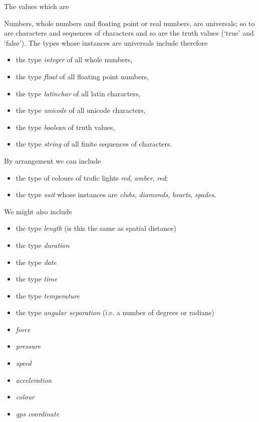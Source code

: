 The values which are 

\mynote 
Numbers, whole numbers and floating point or real numbers, are universals;
 so to are characters and sequences of characters and so are the truth values (`true' and `false'). 
The types whose instances are universals include therefore
\begin{itemize}
	\item the type \textit{integer} of all whole numbers,
	\item the type \textit{float} of all floating point numbers,
	\item the type \textit{latinchar} of all latin characters,
	\item the type \textit{unicode} of all unicode characters,
	\item the type \textit{boolean} of truth values,
	\item the type \textit{string} of all finite sequences of characters.
\end{itemize}

\mynote By arrangement we can include
\begin{itemize}
	\item the type of colours of trafic lights \textit{red}, \textit{amber}, \textit{red};
	\item the type \textit{suit} whose instances are \textit{clubs}, \textit{diamonds}, \textit{hearts}, \textit{spades}.
\end{itemize}

\mynote We might also include
\begin{itemize}
	\item the type \textit{length} (is this the same as spatial distance)
	\item the type \textit{duration}
	\item the type \textit{date}
	\item the type \textit{time}
	\item the type \textit{temperature}
	\item the type \textit{angular separation} (i.e. a number of degrees or radians)
	\item \textit{force}
	\item \textit{pressure}
	\item \textit{speed}
	\item \textit{acceleration}
	\item \textit{colour}
	\item \textit{gps coordinate}
\end{itemize}



